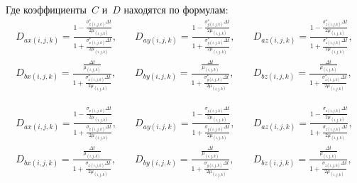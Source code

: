 Где коэффициенты~$C$ и~$D$ находятся по формулам:
\begin{equation*}
\begin{aligned}
D_{ax (i,j,k)} =
\frac
{
    1-\frac{\sigma_{x (i,j,k)}^*\Delta t}{2\mu_{(i,j,k)}}
}{
    1+\frac{\sigma_{x (i,j,k)}^*\Delta t}{2\mu_{(i,j,k)}}
}, \\
D_{bx (i,j,k)} =
\frac
{
    \frac{\Delta t}{\mu_{(i,j,k)}}
}{
    1+\frac{\sigma_{x (i,j,k)}^*\Delta t}{2\mu_{(i,j,k)}}
},
\end{aligned}
\quad
\begin{aligned}
D_{ay (i,j,k)} =
\frac
{
    1-\frac{\sigma_{y (i,j,k)}^*\Delta t}{2\mu_{(i,j,k)}}
}{
    1+\frac{\sigma_{y (i,j,k)}^*\Delta t}{2\mu_{(i,j,k)}}
}, \\
D_{by (i,j,k)} =
\frac
{
    \frac{\Delta t}{\mu_{(i,j,k)}}
}{
    1+\frac{\sigma_{y (i,j,k)}^*\Delta t}{2\mu_{(i,j,k)}}
},
\end{aligned}
\quad
\begin{aligned}
D_{az (i,j,k)} =
\frac
{
    1-\frac{\sigma_{z (i,j,k)}^*\Delta t}{2\mu_{(i,j,k)}}
}{
    1+\frac{\sigma_{z (i,j,k)}^*\Delta t}{2\mu_{(i,j,k)}}
}, \\
D_{bz (i,j,k)} =
\frac
{
    \frac{\Delta t}{\mu_{(i,j,k)}}
}{
    1+\frac{\sigma_{z (i,j,k)}^*\Delta t}{2\mu_{(i,j,k)}}
},
\end{aligned}
\end{equation*}

\begin{equation*}
\begin{aligned}
D_{ax (i,j,k)} =
\frac
{
    1-\frac{\sigma_{x (i,j,k)}\Delta t}{2\mu_{(i,j,k)}}
}{
    1+\frac{\sigma_{x (i,j,k)}\Delta t}{2\mu_{(i,j,k)}}
}, \\
D_{bx (i,j,k)} =
\frac
{
    \frac{\Delta t}{\mu_{(i,j,k)}}
}{
    1+\frac{\sigma_{x (i,j,k)}\Delta t}{2\mu_{(i,j,k)}}
},
\end{aligned}
\quad
\begin{aligned}
D_{ay (i,j,k)} =
\frac
{
    1-\frac{\sigma_{y (i,j,k)}\Delta t}{2\mu_{(i,j,k)}}
}{
    1+\frac{\sigma_{y (i,j,k)}\Delta t}{2\mu_{(i,j,k)}}
}, \\
D_{by (i,j,k)} =
\frac
{
    \frac{\Delta t}{\mu_{(i,j,k)}}
}{
    1+\frac{\sigma_{y (i,j,k)}\Delta t}{2\mu_{(i,j,k)}}
},
\end{aligned}
\quad
\begin{aligned}
D_{az (i,j,k)} =
\frac
{
    1-\frac{\sigma_{z (i,j,k)}\Delta t}{2\mu_{(i,j,k)}}
}{
    1+\frac{\sigma_{z (i,j,k)}\Delta t}{2\mu_{(i,j,k)}}
}, \\
D_{bz (i,j,k)} =
\frac
{
    \frac{\Delta t}{\mu_{(i,j,k)}}
}{
    1+\frac{\sigma_{z (i,j,k)}\Delta t}{2\mu_{(i,j,k)}}
},
\end{aligned}
\end{equation*}

